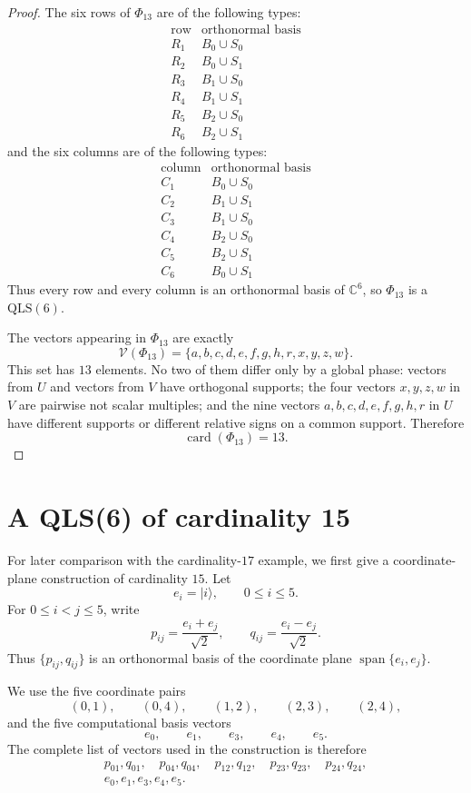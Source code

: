 \documentclass[a4paper,11pt]{article}
\newcommand{\C}{\mathbb{C}}
\newcommand{\ket}[1]{\lvert #1\rangle}
\newcommand{\QLS}{\mathrm{QLS}}
\newcommand{\card}{\operatorname{card}}
\newcommand{\vectset}{\mathcal{V}}
\begin{document}
\begin{proof}
The six rows of $\Phi_{13}$ are of the following types:
\[
\begin{array}{c|c}
\text{row} & \text{orthonormal basis} \\\hline
R_1 & B_0\cup S_0\\
R_2 & B_0\cup S_1\\
R_3 & B_1\cup S_0\\
R_4 & B_1\cup S_1\\
R_5 & B_2\cup S_0\\
R_6 & B_2\cup S_1
\end{array}
\]
and the six columns are of the following types:
\[
\begin{array}{c|c}
\text{column} & \text{orthonormal basis} \\\hline
C_1 & B_0\cup S_0\\
C_2 & B_1\cup S_1\\
C_3 & B_1\cup S_0\\
C_4 & B_2\cup S_0\\
C_5 & B_2\cup S_1\\
C_6 & B_0\cup S_1
\end{array}
\]
Thus every row and every column is an orthonormal basis of $\C^6$, so
$\Phi_{13}$ is a $\QLS(6)$.

The vectors appearing in $\Phi_{13}$ are exactly
\[
  \vectset(\Phi_{13})=\{a,b,c,d,e,f,g,h,r,x,y,z,w\}.
\]
This set has $13$ elements. No two of them differ only by a global phase:
vectors from $U$ and vectors from $V$ have orthogonal supports; the four vectors
$x,y,z,w$ in $V$ are pairwise not scalar multiples; and the nine vectors
$a,b,c,d,e,f,g,h,r$ in $U$ have different supports or different relative signs
on a common support. Therefore
\[
  \card(\Phi_{13})=13.
\]
\end{proof}


\section{A QLS(6) of cardinality 15}

For later comparison with the cardinality-$17$ example, we first give a
coordinate-plane construction of cardinality $15$. Let
\[
  e_i=\ket{i},\qquad 0\leq i\leq 5.
\]
For $0\leq i<j\leq 5$, write
\[
  p_{ij}=\frac{e_i+e_j}{\sqrt2},
  \qquad
  q_{ij}=\frac{e_i-e_j}{\sqrt2}.
\]
Thus $\{p_{ij},q_{ij}\}$ is an orthonormal basis of the coordinate plane
$\operatorname{span}\{e_i,e_j\}$.

We use the five coordinate pairs
\[
  (0,1),\qquad (0,4),\qquad (1,2),\qquad (2,3),\qquad (2,4),
\]
and the five computational basis vectors
\[
  e_0,\qquad e_1,\qquad e_3,\qquad e_4,\qquad e_5.
\]
The complete list of vectors used in the construction is therefore
\[
\begin{gathered}
  p_{01},q_{01},\quad p_{04},q_{04},\quad p_{12},q_{12},\quad
  p_{23},q_{23},\quad p_{24},q_{24},\\
  e_0,e_1,e_3,e_4,e_5.
\end{gathered}
\]
\end{document}

